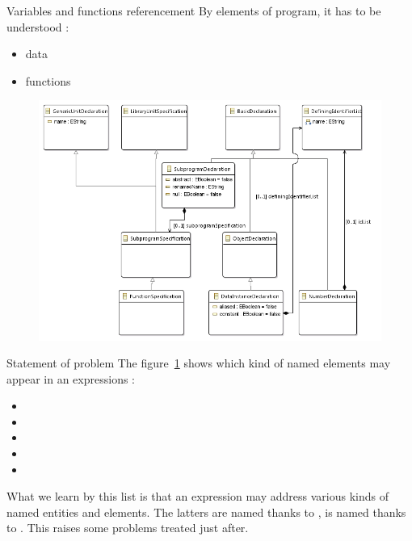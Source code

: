 \documentclass[a4paper]{prjdoc}
\begin{document}
  \begin{asection}{Variables and functions referencement}
  By elements of program, it has to be understood :
     \begin{itemize}
     \item data
     \item functions       
     \end{itemize}
      
     \begin{figure}
     \includegraphics[scale=0.65]{"../../model/Data and Functions initially"}
     \label{fig:DataandFunctionsInitial}
     \end{figure}
     
     \begin{asection}{Statement of problem}
     The figure~\ref{fig:DataandFunctionsInitial} shows which kind of named elements may appear in an expressions :
        \begin{itemize}
        \item {}
        \item {}
        \item {}
        \item {}
        \item {}
        \end{itemize}
    
     What we learn by this list is that an expression may address various kinds of named entities and elements.
     The latters are named thanks to ,  is named 
     thanks to . This raises some problems treated just after.       
     \end{asection} %
       

\end{asection}
\end{document}
